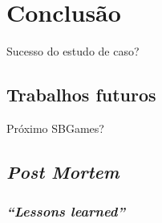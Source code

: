 \chapter{Conclusão}

Sucesso do estudo de caso?

\section{Trabalhos futuros}

Próximo SBGames?

\section{\emph{Post Mortem}}

\subsection{\emph{``Lessons learned''}}

